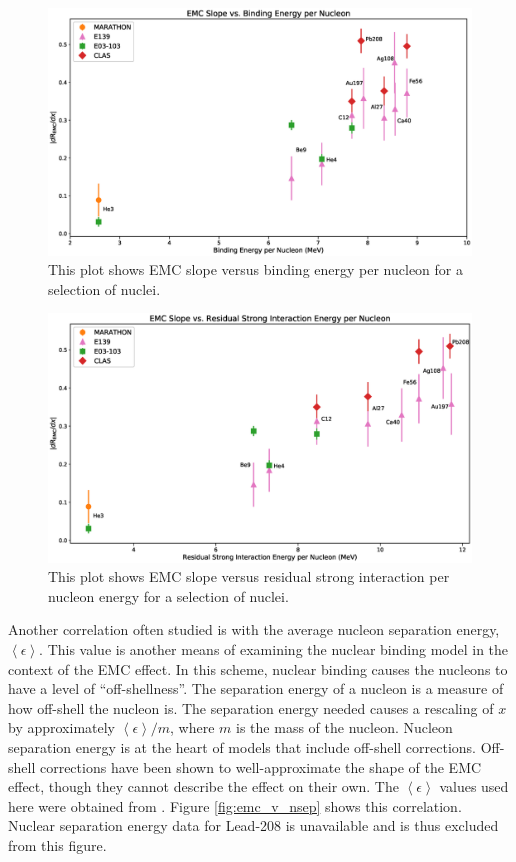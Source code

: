 \begin{figure}[p]
	\includegraphics[width=\textwidth]{./results/fig/EMC_vs_BE.eps}
	\caption{This plot shows EMC slope versus binding energy per nucleon for a selection of nuclei.}
	\label{fig:emc_v_be}
\end{figure}

\begin{figure}[p]
	\includegraphics[width=\textwidth]{./results/fig/EMC_vs_RSIE.eps}
	\caption{This plot shows EMC slope versus residual strong interaction per nucleon energy for a selection of nuclei.}
	\label{fig:emc_v_rsie}
\end{figure}

Another correlation often studied is with the average nucleon separation energy, $\left<\epsilon\right>$. This value is another means of examining the nuclear binding model in the context of the EMC effect. In this scheme, nuclear binding causes the nucleons to have a level of ``off-shellness''. The separation energy of a nucleon is a measure of how off-shell the nucleon is. The separation energy needed causes a rescaling of $x$ by approximately $\left<\epsilon\right>/m$, where $m$ is the mass of the nucleon. Nucleon separation energy is at the heart of models that include off-shell corrections. Off-shell corrections have been shown to well-approximate the shape of the EMC effect, though they cannot describe the effect on their own. The $\left<\epsilon\right>$ values used here were obtained from \cite{arrington_src}. Figure \ref{fig:emc_v_nsep} shows this correlation. Nuclear separation energy data for Lead-208 is unavailable and is thus excluded from this figure.

